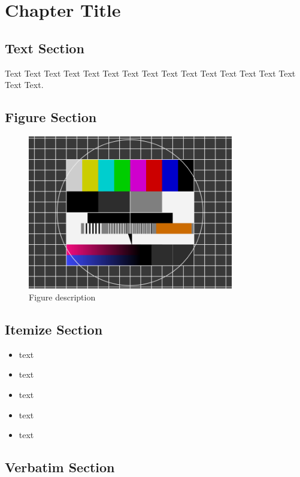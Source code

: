 \chapter{Chapter Title}

\section{Text Section}

Text Text Text Text Text Text Text Text Text Text Text Text Text Text Text Text Text.


\section{Figure Section}

\begin{figure}[H]
\begin{center}
\includegraphics[width=0.8\textwidth]{./Images/test_1.png}
\end{center}
\caption{Figure description}
\end{figure}


\section{Itemize Section}

\begin{itemize}
\item text
\item text
\item text
\item text
\item text
\end{itemize}


\section{Verbatim Section}


